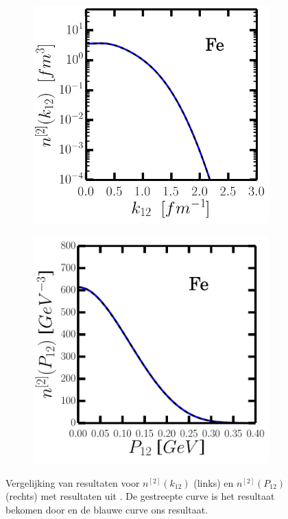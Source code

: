 \documentclass[11pt,twoside]{book}
\begin{document}
\begin{figure}
\begin{subfigure}{0.46\textwidth}
\end{subfigure}
\begin{subfigure}{0.46\textwidth}
\includegraphics[width=\textwidth]{./figuren/Fe_tb_rel.png}
\end{subfigure}
\begin{subfigure}{0.46\textwidth}
\includegraphics[width=\textwidth]{./figuren/Fe_tb_cm.pdf}
\end{subfigure}
\caption{Vergelijking van resultaten voor $n^{[2]}(k_{12})$ (links) en $n^{[2]}(P_{12})$ (rechts) met resultaten uit \cite{maarten}. De gestreepte curve is het resultaat bekomen door \cite{maarten} en de blauwe curve ons resultaat. }
\label{fig:vergelijking}
\end{figure}
\end{document}
